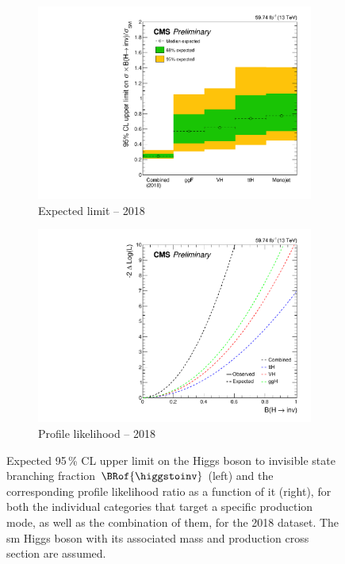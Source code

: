 \begin{figure}[htbp]
    \centering
    \begin{subfigure}[b]{0.45\textwidth}
        \includegraphics[width=\textwidth]{figures/limits/limit_2018_comb_Scenario4.pdf}
        \caption{Expected limit -- 2018}
    \end{subfigure}
    \hspace{0.05\textwidth}
    \begin{subfigure}[b]{0.45\textwidth}
        \includegraphics[width=\textwidth]{figures/likelihood_scan/profile_likelihood_scan_2018_Scenario4.pdf}
        \caption{Profile likelihood -- 2018}
    \end{subfigure}
    \caption[Expected 95\,\% CL upper limit on the Higgs boson to invisible state branching fraction $\BRof{\higgstoinv}$ and the corresponding profile likelihood ratio as a function of it, for both the individual categories that target a specific production mode, as well as the combination of them, for the 2018 dataset]{Expected 95\,\% CL upper limit on the Higgs boson to invisible state branching fraction $\BRof{\higgstoinv}$ (left) and the corresponding profile likelihood ratio as a function of it (right), for both the individual categories that target a specific production mode, as well as the combination of them, for the 2018 dataset. The \acrlong{sm} Higgs boson with its associated mass and production cross section are assumed.}
    \label{fig:htoinv_limit_likelihood_2018}
\end{figure}

